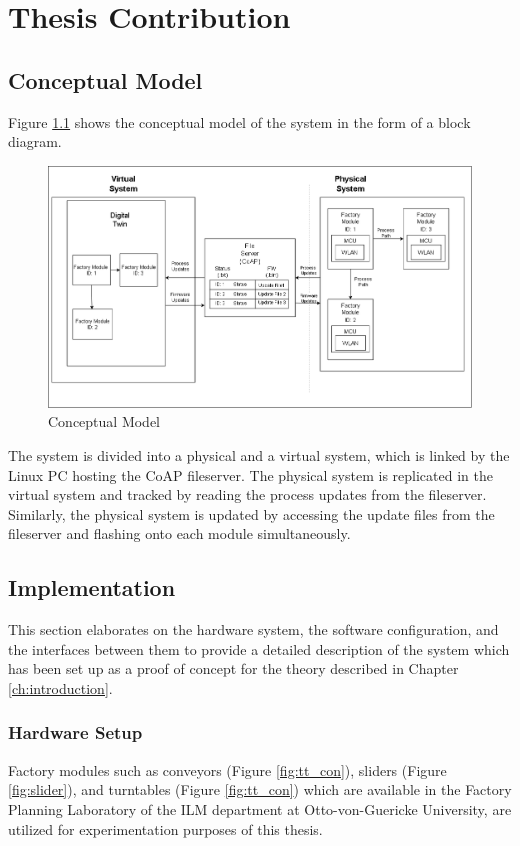 \chapter{Thesis Contribution}
\label{ch:contribution}

\section{Conceptual Model}
Figure \ref{fig:concept} shows the conceptual model of the system in the form of a block diagram.

\begin{figure}[h]
    \centering
    \includegraphics[scale=0.4]{images/Conceptual_Model.png}
    \caption{Conceptual Model}
    \label{fig:concept}
\end{figure}

The system is divided into a physical and a virtual system, which is linked by the Linux PC hosting the \acrshort{CoAP} fileserver. The physical system is replicated in the virtual system and tracked by reading the process updates from the fileserver. Similarly, the physical system is updated by accessing the update files from the fileserver and flashing onto each module simultaneously.

\section{Implementation}
This section elaborates on the hardware system, the software configuration, and the interfaces between them to provide a detailed description of the system which has been set up as a proof of concept for the theory described in Chapter \ref{ch:introduction}. 

\subsection{Hardware Setup}
Factory modules such as conveyors (Figure \ref{fig:tt_con}), sliders (Figure \ref{fig:slider}), and turntables (Figure \ref{fig:tt_con}) which are available in the Factory Planning Laboratory of the \acrfull{ILM} department at Otto-von-Guericke University, are utilized for experimentation purposes of this thesis.

